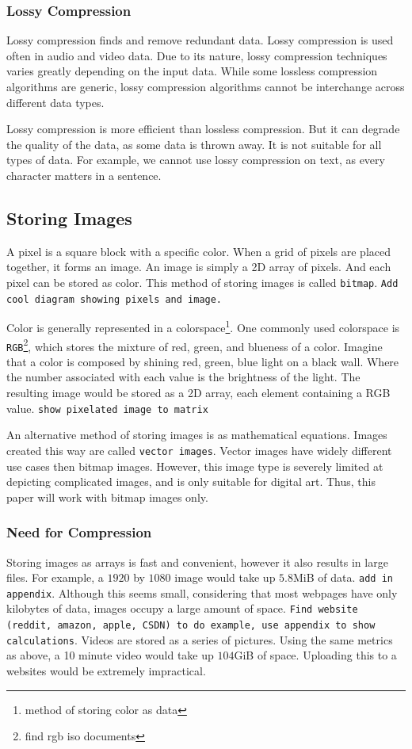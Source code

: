 \documentclass{article}
\begin{document}
\subsubsection{Lossy Compression}
Lossy compression finds and remove redundant data.
Lossy compression is used often in audio and video data.
Due to its nature, lossy compression techniques varies greatly depending on the input data.
While some lossless compression algorithms are generic, lossy compression algorithms cannot be interchange across different data types.

Lossy compression is more efficient than lossless compression.
But it can degrade the quality of the data, as some data is thrown away.
It is not suitable for all types of data.
For example, we cannot use lossy compression on text, as every character matters in a sentence.

\subsection{Storing Images}
A pixel is a square block with a specific color.
When a grid of pixels are placed together, it forms an image.
An image is simply a 2D array of pixels.
And each pixel can be stored as color.
This method of storing images is called \texttt{bitmap}.
\texttt{Add cool diagram showing pixels and image.}

Color is generally represented in a colorspace\footnote{method of storing color as data}.
One commonly used colorspace is \texttt{RGB}\footnote{find rgb iso documents}, which stores the mixture of red, green, and blueness of a color.
Imagine that a color is composed by shining red, green, blue light on a black wall.
Where the number associated with each value is the brightness of the light.
The resulting image would be stored as a 2D array, each element containing a RGB value.
\texttt{show pixelated image to matrix}

An alternative method of storing images is as mathematical equations.
Images created this way are called \texttt{vector images}.
Vector images have widely different use cases then bitmap images.
However, this image type is severely limited at depicting complicated images, and is only suitable for digital art.
Thus, this paper will work with bitmap images only.

\subsubsection{Need for Compression}
Storing images as arrays is fast and convenient, however it also results in large files.
For example, a $1920$ by $1080$ image would take up $5.8$MiB of data.
\texttt{add in appendix}.
Although this seems small, considering that most webpages have only kilobytes of data, images occupy a large amount of space. 
\texttt{Find website (reddit, amazon, apple, CSDN) to do example, use appendix to show calculations}.
Videos are stored as a series of pictures.
Using the same metrics as above, a 10 minute video would take up $104$GiB of space.
Uploading this to a websites would be extremely impractical.
\end{document}
